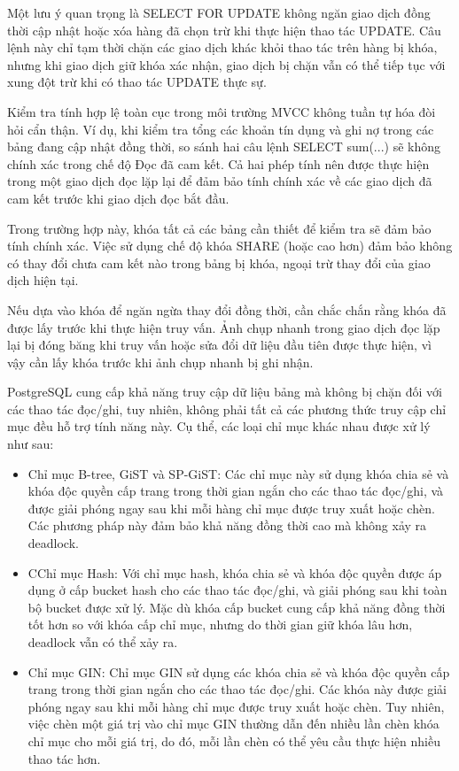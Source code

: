 \begin{enumerate}
    \hspace{1cm}Một lưu ý quan trọng là SELECT FOR UPDATE không ngăn giao dịch đồng thời cập nhật hoặc xóa hàng đã chọn trừ khi thực hiện thao tác UPDATE. Câu lệnh này chỉ tạm thời chặn các giao dịch khác khỏi thao tác trên hàng bị khóa, nhưng khi giao dịch giữ khóa xác nhận, giao dịch bị chặn vẫn có thể tiếp tục với xung đột trừ khi có thao tác UPDATE thực sự.
    
    \hspace{1cm}Kiểm tra tính hợp lệ toàn cục trong môi trường MVCC không tuần tự hóa đòi hỏi cẩn thận. Ví dụ, khi kiểm tra tổng các khoản tín dụng và ghi nợ trong các bảng đang cập nhật đồng thời, so sánh hai câu lệnh SELECT sum(...) sẽ không chính xác trong chế độ Đọc đã cam kết. Cả hai phép tính nên được thực hiện trong một giao dịch đọc lặp lại để đảm bảo tính chính xác về các giao dịch đã cam kết trước khi giao dịch đọc bắt đầu.
    
    \hspace{1cm}Trong trường hợp này, khóa tất cả các bảng cần thiết để kiểm tra sẽ đảm bảo tính chính xác. Việc sử dụng chế độ khóa SHARE (hoặc cao hơn) đảm bảo không có thay đổi chưa cam kết nào trong bảng bị khóa, ngoại trừ thay đổi của giao dịch hiện tại.
    
    \hspace{1cm}Nếu dựa vào khóa để ngăn ngừa thay đổi đồng thời, cần chắc chắn rằng khóa đã được lấy trước khi thực hiện truy vấn. Ảnh chụp nhanh trong giao dịch đọc lặp lại bị đóng băng khi truy vấn hoặc sửa đổi dữ liệu đầu tiên được thực hiện, vì vậy cần lấy khóa trước khi ảnh chụp nhanh bị ghi nhận.
\end{enumerate}

PostgreSQL cung cấp khả năng truy cập dữ liệu bảng mà không bị chặn đối với các thao tác đọc/ghi, tuy nhiên, không phải tất cả các phương thức truy cập chỉ mục đều hỗ trợ tính năng này. Cụ thể, các loại chỉ mục khác nhau được xử lý như sau:
\begin{itemize}
    \item Chỉ mục B-tree, GiST và SP-GiST: Các chỉ mục này sử dụng khóa chia sẻ và khóa độc quyền cấp trang trong thời gian ngắn cho các thao tác đọc/ghi, và được giải phóng ngay sau khi mỗi hàng chỉ mục được truy xuất hoặc chèn. Các phương pháp này đảm bảo khả năng đồng thời cao mà không xảy ra deadlock.
    \item CChỉ mục Hash: Với chỉ mục hash, khóa chia sẻ và khóa độc quyền được áp dụng ở cấp bucket hash cho các thao tác đọc/ghi, và giải phóng sau khi toàn bộ bucket được xử lý. Mặc dù khóa cấp bucket cung cấp khả năng đồng thời tốt hơn so với khóa cấp chỉ mục, nhưng do thời gian giữ khóa lâu hơn, deadlock vẫn có thể xảy ra.
    \item Chỉ mục GIN: Chỉ mục GIN sử dụng các khóa chia sẻ và khóa độc quyền cấp trang trong thời gian ngắn cho các thao tác đọc/ghi. Các khóa này được giải phóng ngay sau khi mỗi hàng chỉ mục được truy xuất hoặc chèn. Tuy nhiên, việc chèn một giá trị vào chỉ mục GIN thường dẫn đến nhiều lần chèn khóa chỉ mục cho mỗi giá trị, do đó, mỗi lần chèn có thể yêu cầu thực hiện nhiều thao tác hơn.
\end{itemize}

